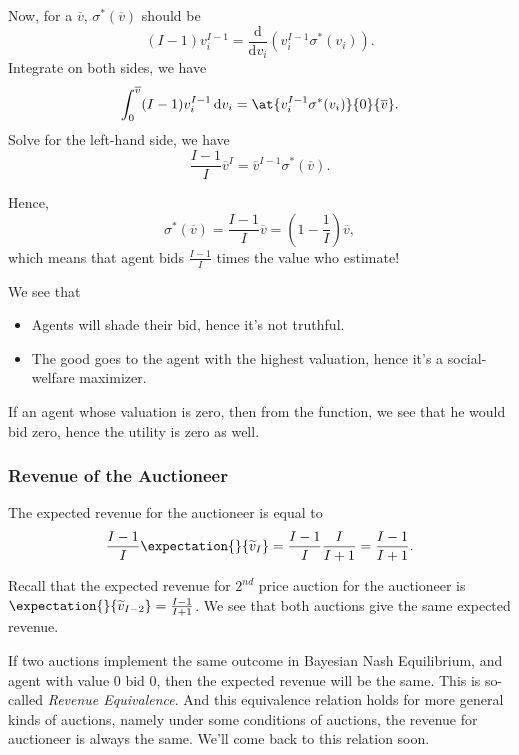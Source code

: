 \par Now, for a \(\overline{v}\), \(\sigma^{*}(\overline{v})\) should be
\[
	(I - 1)v_{i}^{I-1} = \frac{\mathrm{d}}{\mathrm{d}v_{i}} \left(v_{i}^{I-1}\sigma^{*}(v_{i})\right).
\]
Integrate on both sides, we have
\[
	\int_0^{\overline{v}}(I - 1)v_{i}^{I-1}\,\mathrm{d} v_{i} = \at{v_{i}^{I-1}\sigma^{*}(v_{i})}{0}{\overline{v}}.
\]
Solve for the left-hand side, we have
\[
	\frac{I - 1}{I}\overline{v}^I = \overline{v}^{I-1}\sigma^{*}(\overline{v}).
\]

Hence,
\[
	\sigma^{*}(\overline{v}) = \frac{I-1}{I}\overline{v} = (1 - \frac{1}{I})\overline{v},
\]
which means that agent bids \(\frac{I - 1}{I}\) times the value who estimate!

\begin{note}
	We see that
	\begin{itemize}
		\item Agents will shade their bid, hence it's not truthful.
		\item The good goes to the agent with the highest valuation, hence it's a social-welfare maximizer.
	\end{itemize}
\end{note}

\begin{remark}
	If an agent whose valuation is zero, then from the function, we see that he would bid zero, hence the utility is zero as well.
\end{remark}

\subsubsection{Revenue of the Auctioneer}
The expected revenue for the auctioneer is equal to
\[
	\frac{I - 1}{I}\expectation{}{\widetilde{v}_I} = \frac{I - 1}{I}\frac{I}{I+1} = \frac{I - 1}{I+1}.
\]

\begin{remark}
	Recall that the expected revenue for \(2^{nd}\) price auction for the auctioneer is \(\expectation{}{\widetilde{v}_{I-2}} = \frac{I-1}{I+1}\).
	We see that both auctions give the same expected revenue.
\end{remark}

\begin{note}
	If two auctions implement the same outcome in Bayesian Nash Equilibrium, and agent with value \(0\) bid \(0\), then the expected
	revenue will be the same. This is so-called \emph{Revenue Equivalence}. And this equivalence relation holds for more general kinds of
	auctions, namely under some conditions of auctions, the revenue for auctioneer is always the same. We'll come back to this
	relation soon.
\end{note}

